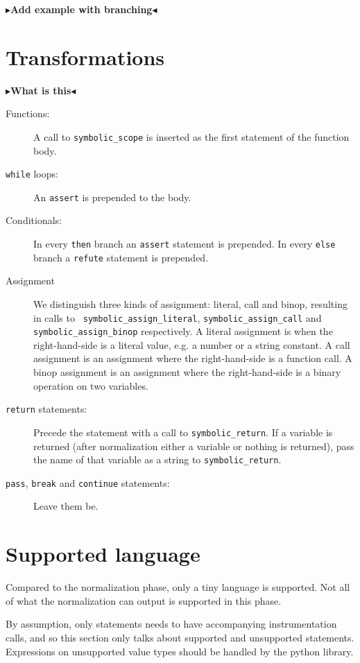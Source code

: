 \documentclass[11pt]{report}
\newcommand{\todo}[1]{{\color[rgb]{.5,0,0}\textbf{$\blacktriangleright$#1$\blacktriangleleft$}}}
\begin{document}
\todo{Add example with branching}

\section{Transformations}
\todo{What is this}

\begin{description}
  \item[Functions:] A call to {\tt symbolic\_scope} is inserted as the
    first statement of the function body.
  \item[{\tt while} loops:] An {\tt assert} is prepended to the body.
  \item[Conditionals:] In every {\tt then} branch an {\tt assert}
    statement is prepended. In every {\tt else} branch a {\tt refute}
    statement is prepended.
  \item[Assignment] We distinguish three kinds of assignment: literal,
    call and binop, resulting in calls to {\tt
      symbolic\_assign\_literal}, {\tt symbolic\_assign\_call} and
    {\tt symbolic\_assign\_binop} respectively. A literal assignment
    is when the right-hand-side is a literal value, e.g. a number or a
    string constant. A call assignment is an assignment where the
    right-hand-side is a function call. A binop assignment is an
    assignment where the right-hand-side is a binary operation on two
    variables.
  \item[{\tt return} statements:] Precede the statement with a call to
    {\tt symbolic\_return}. If a variable is returned (after
    normalization either a variable or nothing is returned), pass the
    name of that variable as a string to {\tt symbolic\_return}.
  \item[{\tt pass}, {\tt break} and {\tt continue} statements:] Leave
    them be.
\end{description}

\section{Supported language}
Compared to the normalization phase, only a tiny language is
supported. Not all of what the normalization can output is supported
in this phase.

By assumption, only statements needs to have accompanying
instrumentation calls, and so this section only talks about supported
and unsupported statements. Expressions on unsupported value types
should be handled by the python library.
\end{document}
